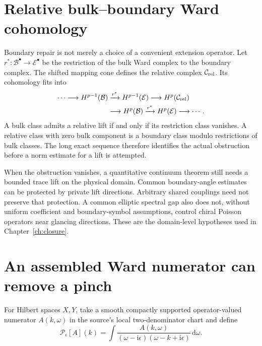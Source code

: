 \documentclass[11pt,a4paper,oneside]{book}
\theoremstyle{plain}
\theoremstyle{definition}
\theoremstyle{remark}
\newcommand{\dd}{\mathrm d}
\newcommand{\ii}{\mathrm i}
\newcommand{\src}[2]{\cite{#1}}
\begin{document}
\section{Relative bulk--boundary Ward cohomology}
Boundary repair is not merely a choice of a convenient extension operator. Let $r^*:\mathcal B^\bullet\to\mathcal E^\bullet$ be the restriction of the bulk Ward complex to the boundary complex. The shifted mapping cone defines the relative complex $\mathcal C_{\rm rel}$. Its cohomology fits into
\begin{equation}
\begin{aligned}
 \cdots\longrightarrow H^{p-1}(\mathcal B)
 &\xrightarrow{r^*}H^{p-1}(\mathcal E)
 \longrightarrow H^p(\mathcal C_{\rm rel})\\
 &\longrightarrow H^p(\mathcal B)
 \xrightarrow{r^*}H^p(\mathcal E)\longrightarrow\cdots.
\end{aligned}
 \label{eq:relative-sequence}
\end{equation}
A bulk class admits a relative lift if and only if its restriction class vanishes. A relative class with zero bulk component is a boundary class modulo restrictions of bulk classes. The long exact sequence therefore identifies the actual obstruction before a norm estimate for a lift is attempted. \src{R2}{thm:v2v92-long-exact}

When the obstruction vanishes, a quantitative continuum theorem still needs a bounded trace lift on the physical domain. Common boundary-angle estimates can be protected by private lift directions. Arbitrary shared couplings need not preserve that protection. A common elliptic spectral gap also does not, without uniform coefficient and boundary-symbol assumptions, control chiral Poisson operators near glancing directions. These are the domain-level hypotheses used in Chapter~\ref{ch:closure}.

\section{An assembled Ward numerator can remove a pinch}
For Hilbert spaces $X,Y$, take a smooth compactly supported operator-valued numerator $A(k,\omega)$ in the source's local two-denominator chart and define
\begin{equation}
 \mathcal P_\epsilon[A](k)
 =\int\frac{A(k,\omega)}{(\omega-\ii\epsilon)
                             (\omega-k+\ii\epsilon)}\,\dd\omega.
 \label{eq:pinch}
\end{equation}
\end{document}
